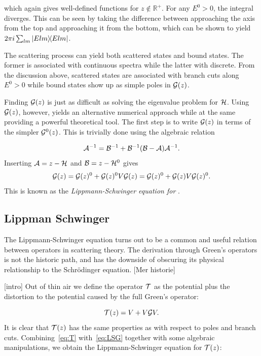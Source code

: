 which again gives well-defined functions for \(z\notin\mathbb{R}^{+}\). For any
\(E^{0} > 0\), the integral diverges. This can be seen by taking the difference
between approaching the axis from the top and approaching it from the bottom,
which can be shown to yield \(2\pi i \sum_{lm}\op{Elm}\).

The scattering process can yield both scattered states and bound states. The
former is associated with continuous spectra while the latter with discrete.
From the discussion above, scattered states are associated with branch cuts
along \(E^{0}>0\) while bound states show up as simple poles in \(\mathcal{G}(z)\).

Finding \(\mathcal{G}(z)\) is just as difficult as solving the eigenvalue problem
for \(\mathcal{H}\). Using \(\mathcal{G}(z)\), however, yields an alternative numerical
approach while at the same providing a powerful theoretical tool. The first step
is to write \(\mathcal{G}(z)\) in terms of the simpler \(\mathcal{G}^{0}(z)\). This is
trivially done using the algebraic relation

\begin{equation*}
  \mathcal{A}^{-1} = \mathcal{B}^{-1} + \mathcal{B}^{-1}(\mathcal{B}-\mathcal{A})\mathcal{A}^{-1}.
\end{equation*}
Inserting \(\mathcal{A} = z-\mathcal{H}\) and \(\mathcal{B} = z-\mathcal{H}^{0}\) gives
\begin{equation}
  \label{eq:LSG}
  \mathcal{G}(z) = \mathcal{G}(z){}^{0} + \mathcal{G}(z){}^{0}V\mathcal{G}(z){} = \mathcal{G}(z){}^{0} + \mathcal{G}(z){}V\mathcal{G}(z){}^{0}.
\end{equation}
This is known as the \textit{Lippmann-Schwinger equation for \mgop{}}.


\subsection{Lippman Schwinger}

The Lippmann-Schwinger equation turns out to be a common and useful relation
between operators in scattering theory. The derivation through Green's operators
is not the historic path, and has the downside of obscuring its physical
relationship to the Schr\"odinger equation.
[Mer historie]

[intro]
Out of thin air we define the operator \(\mathcal{T}\) as the potential plus the
distortion to the potential caused by the full Green's operator:

\begin{equation}
  \label{eq:T}
  \mathcal{T}(z) = V + V\mathcal{G}V.
\end{equation}
It is clear that \(\mathcal{T}(z)\) has the same properties as \mgop{} with respect
to poles and branch cuts. Combining~\eqref{eq:T} with~\eqref{eq:LSG} together
with some algebraic manipulations, we obtain the Lippmann-Schwinger equation for \(\mathcal{T}(z)\):

